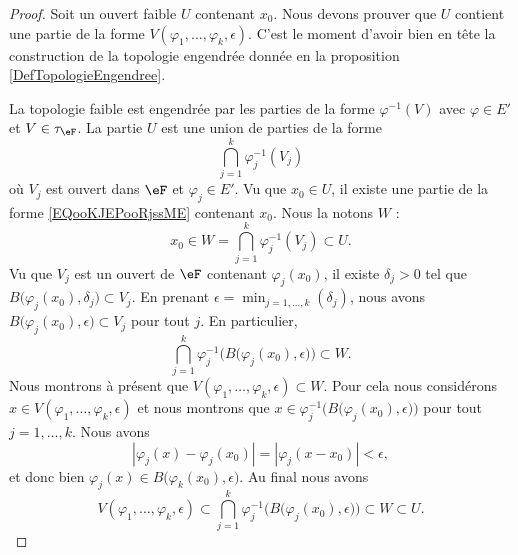 \begin{proof}
	Soit un ouvert faible \( U\) contenant \( x_0\). Nous devons prouver que \( U\) contient une partie de la forme \( V(\varphi_1,\ldots, \varphi_k,\epsilon)\). C'est le moment d'avoir bien en tête la construction de la topologie engendrée donnée en la proposition \ref{DefTopologieEngendree}.

	La topologie faible est engendrée par les parties de la forme \( \varphi^{-1}(V)\) avec \( \varphi\in E'\) et \( V\in \tau_{\eF}\). La partie \( U\) est une union de parties de la forme
	\begin{equation}        \label{EQooKJEPooRjssME}
		\bigcap_{j=1}^k\varphi_j^{-1}(V_j)
	\end{equation}
	où \( V_j\) est ouvert dans \( \eF\) et \( \varphi_j\in E'\). Vu que \( x_0\in U\), il existe une partie de la forme \eqref{EQooKJEPooRjssME} contenant \( x_0\). Nous la notons \( W\) :
	\begin{equation}
		x_0\in W=\bigcap_{j=1}^k\varphi_j^{-1}(V_j)\subset U.
	\end{equation}
	Vu que \( V_j\) est un ouvert de \( \eF\) contenant \( \varphi_j(x_0)\), il existe \( \delta_j>0\) tel que \( B\big( \varphi_j(x_0),\delta_j \big)\subset V_j\). En prenant \( \epsilon=\min_{j=1,\ldots, k}(\delta_j)\), nous avons \( B\big( \varphi_j(x_0),\epsilon \big)\subset V_j\) pour tout \( j\). En particulier,
	\begin{equation}
		\bigcap_{j=1}^k\varphi_j^{-1}\Big( B\big(\varphi_j(x_0),\epsilon\big) \Big)\subset W.
	\end{equation}
	Nous montrons à présent que \( V(\varphi_1,\ldots, \varphi_k,\epsilon)\subset W\). Pour cela nous considérons \( x\in V(\varphi_1,\ldots, \varphi_k,\epsilon)\) et nous montrons que \( x\in\varphi_j^{-1}\Big( B\big( \varphi_j(x_0),\epsilon \big) \Big)\) pour tout \( j=1,\ldots, k\). Nous avons
	\begin{equation}
		| \varphi_j(x)-\varphi_j(x_0) |=| \varphi_j(x-x_0) |<\epsilon,
	\end{equation}
	et donc bien \( \varphi_j(x)\in B\big( \varphi_k(x_0),\epsilon \big)\). Au final nous avons
	\begin{equation}
		V(\varphi_1,\ldots, \varphi_k,\epsilon)\subset\bigcap_{j=1}^k\varphi_j^{-1}\Big( B\big( \varphi_j(x_0),\epsilon \big) \Big)\subset W\subset U.
	\end{equation}
\end{proof}

